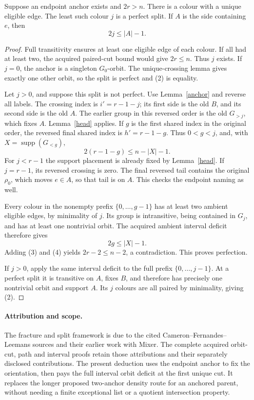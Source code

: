 \documentclass[11pt,a4paper]{article}
\begin{document}
\begin{theorem}\label{first}
Suppose an endpoint anchor exists and $2r>n$. There is
a colour with a unique eligible edge. The least such
colour $j$ is a perfect split. If $A$ is the side containing
$e$, then
\[
                              2j\le |A|-1.             \tag{2}
\]
\end{theorem}
\begin{proof}
Full transitivity ensures at least one eligible edge of
each colour. If all had at least two, the acquired paired-cut
bound would give $2r\le n$. Thus $j$ exists.
If $j=0$, the anchor is a singleton $G_0$-orbit.
The unique-crossing lemma gives exactly one other orbit,
so the split is perfect and (2) is equality.

Let $j>0$, and suppose this split is not perfect.
Use Lemma~\ref{anchor} and reverse all labels.
The crossing index is $i'=r-1-j$; its first side is the
old $B$, and its second side is the old $A$.
The earlier group in this reversed order is the old
$G_{>j}$, which fixes $A$. Lemma~\ref{head} applies.
If $g$ is the first shared index in the original order,
the reversed final shared index is $h'=r-1-g$.
Thus $0<g<j$, and, with $X=\operatorname{supp}(G_{<g})$,
\[
                     2(r-1-g)\le n-|X|-1.             \tag{3}
\]
For $j<r-1$ the support placement is already fixed by
Lemma~\ref{head}. If $j=r-1$, its reversed crossing is
zero. The final reversed tail contains the original
$\rho_0$, which moves $e\in A$, so that tail is on $A$.
This checks the endpoint naming as well.

Every colour in the nonempty prefix $\{0,\ldots,g-1\}$
has at least two ambient eligible edges, by minimality
of $j$. Its group is intransitive, being contained in
$G_j$, and has at least one nontrivial orbit. The acquired
ambient interval deficit therefore gives
\[
                              2g\le |X|-1.             \tag{4}
\]
Adding (3) and (4) yields $2r-2\le n-2$, a contradiction.
This proves perfection.

If $j>0$, apply the same interval deficit to the full
prefix $\{0,\ldots,j-1\}$. At a perfect split it is
transitive on $A$, fixes $B$, and therefore has precisely
one nontrivial orbit and support $A$. Its $j$ colours
are all paired by minimality, giving (2).
\end{proof}

\paragraph{Attribution and scope.}
The fracture and split framework is due to the cited
Cameron--Fernandes--Leemans sources and their earlier work
with Mixer. The complete acquired orbit-cut, path and
interval proofs retain those attributions and their
separately disclosed contributions. The present deduction
uses the endpoint anchor to fix the orientation, then pays
the full interval orbit deficit at the first unique cut.
It replaces the longer proposed two-anchor density route
for an anchored parent, without needing a finite exceptional
list or a quotient intersection property.
\end{document}
